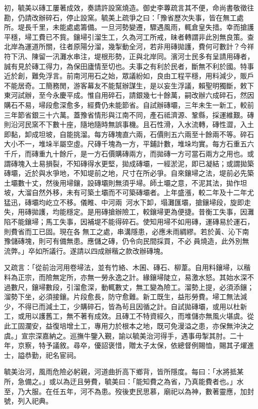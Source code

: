 \begin{pinyinscope}
初，毓美以磚工屢著成效，奏請許設窯燒造。御史李蓴疏言其不便，命尚書敬徵往勘，仍請改辦碎石，停止設窯。毓美上疏爭之曰：「豫省歷次失事，皆在無工處所。堤長千里，未能處處籌備。一旦河勢變遷，驟遇風雨，輒倉皇失措。幸而搶護平穩，埽工費已不貲。鑲埽引溜生工，久為河工所戒，昧者轉謂非此別無良策。查北岸為運道所關，往者原陽分溜，幾掣動全河，若非用磚拋護，費何可數計？今祥符下汛、陳留一汛灘水串注，堤根形勢，正與北岸同。濱河士民多有呈請用磚者，誠有見於磚工得力，為保田廬情至切也。夫事之有利於民者，斷無不利於國。特事近於創，難免浮言。前南河用石之始，眾議紛如，良由工程平穩，用料減少，販戶不能居奇。工簡務閒，游客幕友不能幫辦謀生，是以妄生浮議，賴聖明獨斷，敕下東河試辦，至今永慶平成。惟自用碎石，請銀幾七十餘萬，嗣改辦六成碎石，然因購石不易，埽段愈深愈多，經費仍未能節省。自試辦磚壩，三年未生一新工，較前三年節省銀三十六萬。蓋豫省情形與江南不同，產石祗濟源、鞏縣，採運維艱。磚則沿河民窯不下數十座，隨地隨時無誤事機。且石性滑，入水流轉，磚性澀，入土即黏，卸成坦坡，自能挑溜。每方磚塊直六兩，石價則五六兩至十餘兩不等。碎石大小不一，堆垛半屬空虛。尺磚千塊為一方，平鋪計數，堆垛均實。每方石重五六千斤，而磚重九十餘斤，是一方石價購磚兩方，而拋磚一方可當石兩方之用也。或謂磚塊入土易損裂，不知磚得水更堅，拋成磚壩，一經淤泥，即已凝結；或謂拋築磚壩，近於與水爭地，不知堤前之地，尺寸在所必爭。自來鑲埽之法，堤前必先築土壩數十丈，然後用埽鑲，設磚壩則無須乎埽。師土壩之意，不泥其法，拋作坦坡，大溜自然外移，未有可築土壩而不可築磚壩者。上年盛漲，較二年及十二年尤猛迅，磚壩均屹立不移。儀睢、中河兩，河水下卸，塌灘匯壩，搶鑲埽段，旋即走失，用磚拋護，均能穩定。是用磚搶辦險工，較鑲埽更為便捷。昔衡工失事，因灘陷不能鑲埽；馬工失事，因補堤不能得碎石。使知用埽不如用磚，運磚易於運石，則費省而工已固。現在各無工之處，串溝隱患，必應未雨綢繆。若於黃、沁下南豫儲磚塊，則可有備無患。應儲之磚，仍令向民間採買，不必員燒造，此外別無流弊。」卒如所議行。遂請以四成辦稭之款改辦磚塊。

又疏言：「從前治河用卷埽法，並有竹絡、木囷、磚石、柳葦。自用料鑲埽，以稭料為正宗，而險無定所，亦無一勞永逸之計。緣鑲埽陡立，易激水怒。其始水深不過數尺，鑲埽數段，引溜愈深，動輒數丈，無工變為險工。溜勢上提，必須添鑲；溜勢下坐，必須接鑲。片段愈長，防守愈難。新工既生，益形勞費。埽工無法減少，不得已而減土工，少購碎石，皆為茍且因循之計。自試拋磚壩，或用以杜新工，或用以護舊工，無不著有成效。且磚工不特資經久，而堆儲亦無風火堪虞。從此工固瀾安，益復培增土工，專用力於根本之地，既可免漫溢之患，亦保無沖決之虞。」宣宗深嘉納之。巡撫牛鑒入覲，諭以毓美治河得手，遇事毋掣其肘。二十年，京察，特予議敘。尋卒，優詔褒惜，贈太子太保，依總督例賜恤，賜其子燿進士，謚恭勤，祀名宦祠。

毓美治河，風雨危險必躬親，河道曲折高下鄉背，皆所隱度。每曰：「水將抵某所，急備之。」或以為迂且勞費，毓美曰：「能知費之為省，乃真能費者也。」水至，乃大服。在任五年，河不為患。歿後吏民思慕，廟祀以為神，數著靈應，加封號，列入祀典。


\end{pinyinscope}
